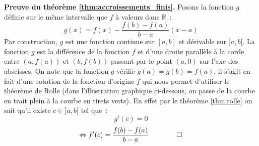 \documentclass[10pt,notheorems]{beamer}
\theoremstyle{plain}
\theoremstyle{definition} %
\begin{document}
\begin{frame}
\begin{columns}[onlytextwidth]
\begin{column}{0.5\textwidth}
\begin{center}
{}
      \end{center}
    \end{column}
  \end{columns}
\end{frame}

\begin{notes}

  \textbf{Preuve du théorème \hyperlink{slide_accroissements_finis_1}{\ref{thm:accroissements_finis}}.} Posons la fonction $g$ définie sur le même intervalle que $f$ à valeurs dans $\mathbb R$~:
  \[
    g(x) = f(x)-\frac{f(b)-f(a)}{b-a}(x-a)
  \]
  Par construction, $g$ est une fonction continue sur $[a,b]$ et dérivable sur $]a,b[$. La fonction $g$ est la différence de la fonction $f$ et d'une droite parallèle à la corde entre $(a,f(a))$ et $(b,f(b))$ passant par le point $(a,0)$ sur l'axe des abscisses. On note que la fonction $g$ vérifie $g(a) = g(b) = f(a)$, il s'agit en fait d'une rotation de la fonction d'origine $f$ qui nous permet d'utiliser le théorème de Rolle (dans l'illustration graphique ci-dessous, on passe de la courbe en trait plein à la courbe en tirets verts). En effet par le théorème \hyperlink{slide_extrema_2}{\ref{thm:rolle}} on sait qu'il existe $c\in]a,b[$ tel que~:
  \[
    g'(c) = 0
  \]
  \[
    \Leftrightarrow f'(c) = \frac{f(b)-f(a)}{b-a}\quad\quad\qed
  \]


\end{notes}
\end{document}
